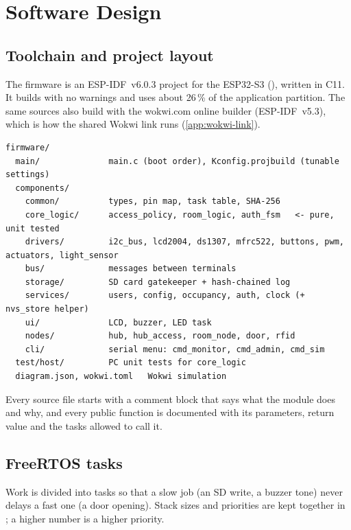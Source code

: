 \section{Software Design}
\label{sec:software}

\subsection{Toolchain and project layout}
The firmware is an ESP-IDF~v6.0.3 project for the ESP32-S3 (), written in C11. It
builds with no warnings and uses about 26\,\% of the application partition. The same sources also
build with the wokwi.com online builder (ESP-IDF~v5.3), which is how the shared Wokwi link runs
(\cref{app:wokwi-link}).

\begin{lstlisting}[style=console]
firmware/
  main/              main.c (boot order), Kconfig.projbuild (tunable settings)
  components/
    common/          types, pin map, task table, SHA-256
    core_logic/      access_policy, room_logic, auth_fsm   <- pure, unit tested
    drivers/         i2c_bus, lcd2004, ds1307, mfrc522, buttons, pwm, actuators, light_sensor
    bus/             messages between terminals
    storage/         SD card gatekeeper + hash-chained log
    services/        users, config, occupancy, auth, clock (+ nvs_store helper)
    ui/              LCD, buzzer, LED task
    nodes/           hub, hub_access, room_node, door, rfid
    cli/             serial menu: cmd_monitor, cmd_admin, cmd_sim
  test/host/         PC unit tests for core_logic
  diagram.json, wokwi.toml   Wokwi simulation
\end{lstlisting}

Every source file starts with a comment block that says what the module does and why, and every
public function is documented with its parameters, return value and the tasks allowed to call it.

\subsection{FreeRTOS tasks}
\label{sec:sw-tasks}
Work is divided into tasks so that a slow job (an SD write, a buzzer tone) never delays a fast
one (a door opening). Stack sizes and priorities are kept together in
; a higher number is a higher priority.

